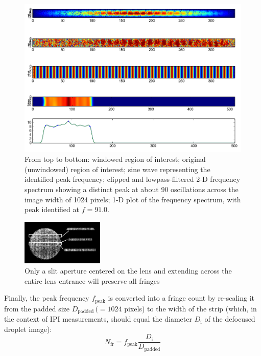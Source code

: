 \documentclass[11.5pt,oneside]{book}
\begin{document}
\begin{figure}[h]
    \centering
    \includegraphics[height=0.38\textheight]{img/globalsizing-dropletpeak.png}
    \caption{From top to bottom: windowed region of interest; original
    (unwindowed) region of interest; sine wave representing the identified peak
frequency; clipped and lowpass-filtered 2-D frequency spectrum showing a distinct
peak at about 90 oscillations across the image width of 1024 pixels; 1-D plot of
the frequency spectrum, with peak identified at $f=91.0$.}
    \label{fig:globalsizing-dropletpeak}
\end{figure}

\begin{figure}
    \centering
    \includegraphics[width=0.35\textwidth]{img/dropletslitcropping2.jpg}
    \caption{Only a slit aperture centered on the lens and extending across the
    entire lens entrance will preserve all fringes \label{fig:droplet-slitcropping}}
\end{figure}
Finally, the peak frequency $f_\text{peak}$ is converted into a fringe count by re-scaling it
from the padded size $D_\text{padded}\, (= 1024$ pixels) to the width of the strip (which, in the
context of IPI measurements, should equal the diameter $D_\text{i}$ of the defocused droplet
image):
\begin{equation}
    N_\text{fr} = f_\text{peak} \frac{D_\text{i}}{D_\text{padded}}
    \label{fringes-from-diameter}
\end{equation}
\end{document}
